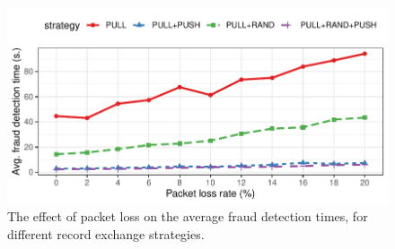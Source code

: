 

\begin{figure}[t]
	\centering
	\includegraphics[width=.9\linewidth]{trustchain/assets/fraud_times_send_failure}
	\caption{The effect of packet loss on the average fraud detection times, for different record exchange strategies.}
	\label{fig:fraud_times_link_failures}
\end{figure}


